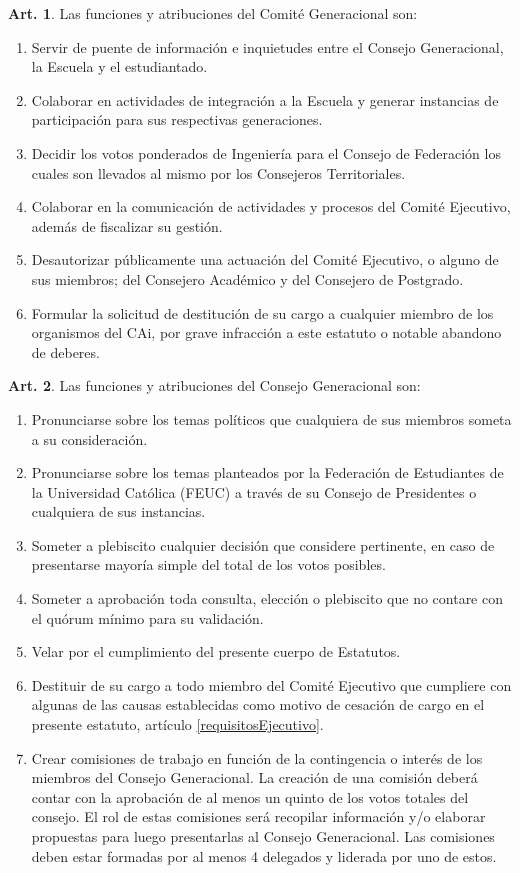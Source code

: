 \documentclass[letterpaper,11pt]{article}
\theoremstyle{definition}%
\newtheorem{art}{Art.} %
\begin{document}
\begin{art}\label{funcionesComiteGeneracional}
	Las funciones y atribuciones del Comité Generacional son:
	\begin{enumerate}
		\item Servir de puente de información e inquietudes entre el Consejo Generacional, la Escuela y el estudiantado.
		\item Colaborar en actividades de integración a la Escuela y generar instancias de participación para sus respectivas generaciones.
		\item Decidir los votos ponderados de Ingeniería para el Consejo de Federación los cuales son llevados al mismo por los Consejeros Territoriales.
		\item Colaborar en la comunicación de actividades y procesos del Comité Ejecutivo, además de fiscalizar su gestión.
		\item Desautorizar públicamente una actuación del Comité Ejecutivo, o alguno de sus miembros; del Consejero Académico y del Consejero de Postgrado.
		\item Formular la solicitud de destitución de su cargo a cualquier miembro de los organismos del CAi, por grave infracción a este estatuto o notable abandono de deberes.
	\end{enumerate}
\end{art}

\begin{art}\label{funcionesConsejoGeneracional}
	Las funciones y atribuciones del Consejo Generacional son:
	\begin{enumerate}
		\item Pronunciarse sobre los temas políticos que cualquiera de sus miembros someta a su consideración.
		\item Pronunciarse sobre los temas planteados por la Federación de Estudiantes de la Universidad Católica (FEUC) a través de su Consejo de Presidentes o cualquiera de sus instancias.
		\item Someter a plebiscito cualquier decisión que considere pertinente, en caso de presentarse mayoría simple del total de los votos posibles.
		\item Someter a aprobación toda consulta, elección o plebiscito que no contare con el quórum mínimo para su validación.
		\item Velar por el cumplimiento del presente cuerpo de Estatutos.
		\item Destituir de su cargo a todo miembro del Comité Ejecutivo que cumpliere con algunas de las causas establecidas como motivo de cesación de cargo en el presente estatuto, artículo \ref{requisitosEjecutivo}.
		\item  Crear comisiones de trabajo en función de la contingencia o interés de los miembros del Consejo Generacional. La creación de una comisión deberá contar con la aprobación de al menos un quinto de los votos totales del consejo. El rol de estas comisiones será recopilar información y/o elaborar propuestas para luego presentarlas al Consejo Generacional. Las comisiones deben estar formadas por al menos 4 delegados y liderada por uno de estos.
	\end{enumerate}
\end{art}
\end{document}
